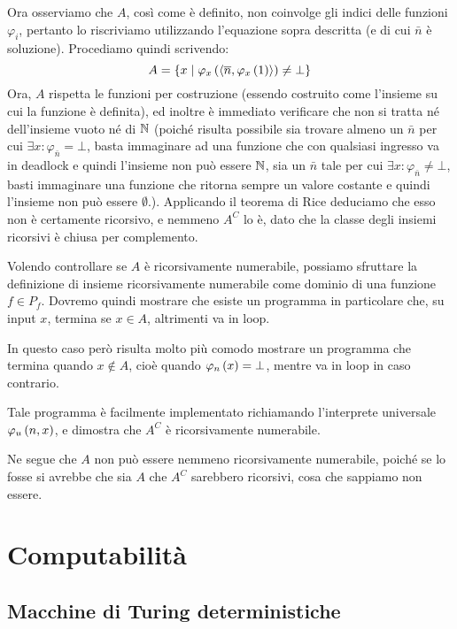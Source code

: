 \documentclass{lectures}
\begin{document}
\begin{solution}
\begin{multicols}{2}
        Ora osserviamo che \(A\), così come è definito, non coinvolge gli indici delle funzioni \(\varphi_i\), pertanto lo riscriviamo utilizzando l'equazione sopra descritta (e di cui \(\bar{n}\) è soluzione). Procediamo quindi scrivendo:
        \[
            A = \left\{x\mid \varphi_x\left(\left\langle\overline{n}, \varphi_x\left(1\right)\right\rangle\right)\neq\bot\right\}
        \]
        Ora, \(A\) rispetta le funzioni per costruzione (essendo costruito come l'insieme su cui la funzione è definita), ed inoltre è immediato verificare che non si tratta né dell'insieme vuoto né di \(\mathbb{N}\) (poiché risulta possibile sia trovare almeno un \(\bar{n}\) per cui \(\exists x: \varphi_{\bar{n}} = \bot\), basta immaginare ad una funzione che con qualsiasi ingresso va in deadlock e quindi l'insieme non può essere \(\mathbb{N}\), sia un \(\bar{n}\) tale per cui \(\exists x:\varphi_{\bar{n}} \neq \bot\), basti immaginare una funzione che ritorna sempre un valore costante e quindi l'insieme non può essere \(\emptyset\).). Applicando il teorema di Rice deduciamo che esso non è certamente ricorsivo, e nemmeno \(A^C\) lo è, dato che la classe degli insiemi ricorsivi è chiusa per complemento.
        
        Volendo controllare se \(A\) è ricorsivamente numerabile, possiamo sfruttare la definizione di insieme ricorsivamente numerabile come dominio di una funzione \(f\in P_f\). Dovremo quindi mostrare che esiste un programma in particolare che, su input \(x\), termina se \(x\in A\), altrimenti va in loop.
        
        In questo caso però risulta molto più comodo mostrare un programma che termina quando \(x \not\in A\), cioè quando \(\varphi_n\left(x\right) = \bot\), mentre va in loop in caso contrario.
        
        Tale programma è facilmente implementato richiamando l'interprete universale \(\varphi_u\left(n,x\right)\), e dimostra che \(A^C\) è ricorsivamente numerabile.
        
        Ne segue che \(A\) non può essere nemmeno ricorsivamente numerabile, poiché se lo fosse si avrebbe che sia \(A\) che \(A^C\) sarebbero ricorsivi, cosa che sappiamo non essere.
    \end{multicols}
\end{solution}

\part{Computabilità}
\chapter{Macchine di Turing deterministiche}
\end{document}
